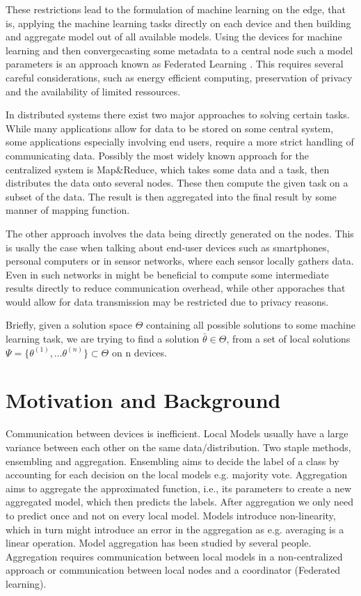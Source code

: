 These restrictions lead to the formulation of machine learning on the edge, that is, applying the machine learning tasks directly on each device and then building and aggregate model out of all available models.
Using the devices for machine learning and then convergecasting some metadata to a central node such a model parameters is an approach known as Federated Learning .
This requires several careful considerations, such as energy efficient computing, preservation of privacy and the availability of limited ressources.

In distributed systems there exist two major approaches to solving certain tasks. 
While many applications allow for data to be stored on some central system, some applications especially involving end users, require a more strict handling of communicating data.
Possibly the most widely known approach for the centralized system is Map\&Reduce, which takes some data and a task, then distributes the data onto several nodes.
These then compute the given task on a subset of the data.
The result is then aggregated into the final result by some manner of mapping function.

The other approach involves the data being directly generated on the nodes.
This is usally the case when talking about end-user devices such as smartphones, personal computers or in sensor networks, where each sensor locally gathers data.
Even in such networks in might be beneficial to compute some intermediate results directly to reduce communication overhead, while other apporaches that would allow for data transmission may be restricted due to privacy reasons.


Briefly, given a solution space $\Theta$ containing all possible solutions to some machine learning task, we are trying to find a solution $\bar{\theta} \in \Theta$, from a set of local solutions $\Psi = \{\theta^{(1)}, \ldots \theta^{(n)}\} \subset \Theta$ on n devices.



\section{Motivation and Background}
Communication between devices is inefficient.
Local Models usually have a large variance between each other on the same data/distribution.
Two staple methods, ensembling and aggregation.
Ensembling aims to decide the label of a class by accounting for each decision on the local models e.g. majority vote.
Aggregation aims to aggregate the approximated function, i.e., its parameters to create a new aggregated model, which then predicts the labels.
After aggregation we only need to predict once and not on every local model.
Models introduce non-linearity, which in turn might introduce an error in the aggregation as e.g. averaging is a linear operation.
Model aggregation has been studied by several people.
Aggregation requires communication between local models in a non-centralized approach or communication between local nodes and a coordinator (Federated learning).

